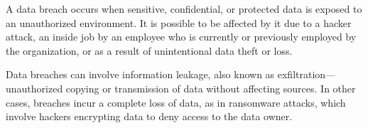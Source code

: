 {{%

A data breach occurs when sensitive, confidential, or protected data is exposed to an unauthorized environment. It is possible to be affected by it due to a hacker attack, an inside job by an employee who is currently or previously employed by the organization, or as a result of unintentional data theft or loss.

Data breaches can involve information leakage, also known as exfiltration—unauthorized copying or transmission of data without affecting sources. In other cases, breaches incur a complete loss of data, as in ransomware attacks, which involve hackers encrypting data to deny access to the data owner.

}}
